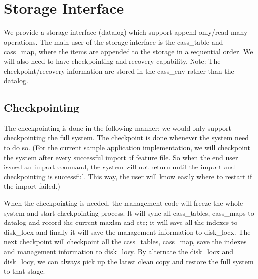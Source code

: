 %       
% 
% 
% 
\section {Storage Interface}
We provide a storage interface (datalog) which support append-only/read many
operations. The main user of the storage interface is the cass\_table
and cass\_map, where the items are appended to the storage in a
sequential order. We will also need to have checkpointing and
recovery capability. Note: The checkpoint/recovery information are
stored in the cass\_env rather than the datalog. 

\subsection {Checkpointing}
The checkpointing is done in the following manner: we would only support
checkpointing the full system. The checkpoint is done whenever the
system need to do so. (For the current sample application
implementation, we will checkpoint the system after every successful
import of feature file. So when the end user issued an import command,
the system will not return until the import and checkpointing is
successful. This way, the user will know easily where to restart if
the import failed.)

When the checkpointing is needed, the management code will freeze the
whole system and start checkpointing process. It will sync all
cass\_tables, cass\_maps to datalog and record the current maxlsn and
etc; it will save all the indexes to disk\_locx and 
finally it will save the management information to disk\_locx. The next
checkpoint will checkpoint all the cass\_tables, cass\_map, save
the indexes and management information to disk\_locy. By alternate the
disk\_locx and disk\_locy, we can always pick up the latest clean copy
and restore the full system to that stage. 


